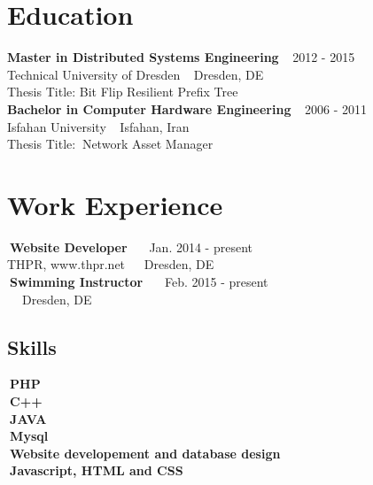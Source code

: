 \documentclass[line,margin]{res}
\begin{document}
\newcommand*{\TitleFont}{%
      \usefont{\encodingdefault}{\rmdefault}{b}{n}%
      \fontsize{24}{14}%
      \selectfont}
\name  { \TitleFont {\bf { Mina Ahmadi}  }}

\address { 
$~$ $~$ }
 
\begin{resume}
 
   
\section{Education} 
{\bf Master in Distributed Systems Engineering}  \hfill $~~$  2012 - 2015\\
  Technical University of Dresden  \hfill $~~$ Dresden, DE \\
  Thesis Title: Bit Flip Resilient Prefix Tree\\
{\bf Bachelor in Computer Hardware Engineering}  \hfill $~~$  2006 - 2011\\
  Isfahan University \hfill $~~$ Isfahan, Iran \\
  Thesis Title: $~$Network Asset Manager\\
  
  
 \section{Work Experience}


 \textbullet$~${\bf Website Developer}  \hfill $~~~~~$  Jan. 2014 - present\\ 
 THPR, www.thpr.net  $~~~~$ \hfill  Dresden, DE\\

 \textbullet$~${\bf Swimming Instructor}  \hfill $~~~~~$  Feb. 2015 - present\\   $~~~~$ \hfill Dresden, DE\\
\begin{flushleft}  
\section{Skills}
\textbullet$~${\bf PHP}\\
\textbullet$~${\bf C++ }\\
\textbullet$~${\bf JAVA }\\
\textbullet$~${\bf Mysql}\\
\textbullet$~${\bf Website developement and database design }\\
\textbullet$~${\bf Javascript, HTML and CSS }\\
\end{flushleft}


\end{resume}
\end{document}
